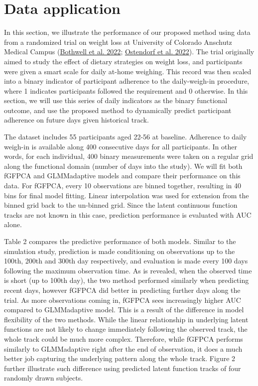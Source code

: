 \documentclass[
  11pt,
]{article}
\begin{document}
\hypertarget{data-application}{%
\section{Data application}\label{data-application}}

In this section, we illustrate the performance of our proposed method
using data from a randomized trial on weight loss at University of
Colorado Anschutz Medical Campus
(\protect\hyperlink{ref-bothwell2022}{Bothwell et al. 2022};
\protect\hyperlink{ref-ostendorf2022}{Ostendorf et al. 2022}). The trial
originally aimed to study the effect of dietary strategies on weight
loss, and participants were given a smart scale for daily at-home
weighing. This record was then scaled into a binary indicator of
participant adherence to the daily-weigh-in procedure, where 1 indicates
participants followed the requirement and 0 otherwise. In this section,
we will use this series of daily indicators as the binary functional
outcome, and use the proposed method to dynamically predict participant
adherence on future days given historical track.

The dataset includes 55 participants aged 22-56 at baseline. Adherence
to daily weigh-in is available along 400 consecutive days for all
participants. In other words, for each individual, 400 binary
measurements were taken on a regular grid along the functional domain
(number of days into the study). We will fit both fGFPCA and
GLMMadaptive models and compare their performance on this data. For
fGFPCA, every 10 observations are binned together, resulting in 40 bins
for final model fitting. Linear interpolation was used for extension
from the binned grid back to the un-binned grid. Since the latent
continuous function tracks are not known in this case, prediction
performance is evaluated with AUC alone.

Table 2 compares the predictive performance of both models. Similar to
the simulation study, prediction is made conditioning on observations up
to the 100th, 200th and 300th day respectively, and evaluation is made
every 100 days following the maximum observation time. As is revealed,
when the observed time is short (up to 100th day), the two method
performed similarly when predicting recent days, however fGFPCA did
better in predicting further days along the trial. As more observations
coming in, fGFPCA sees increasingly higher AUC compared to GLMMadaptive
model. This is a result of the difference in model flexibility of the
two methods. While the linear relationship in underlying latent
functions are not likely to change immediately following the observed
track, the whole track could be much more complex. Therefore, while
fGFPCA performs similarly to GLMMadaptive right after the end of
observation, it does a much better job capturing the underlying pattern
along the whole track. Figure 2 further illustrate such difference using
predicted latent function tracks of four randomly drawn subjects.
\end{document}

